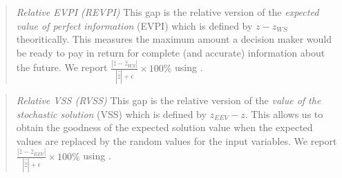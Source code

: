 
\begin{quote}
\noindent\textit{Relative EVPI (REVPI)} This gap is the relative version of the \textit{expected value of perfect information} (EVPI) which is defined by $z-z_{WS}$ theoritically. This measures the maximum amount a decision maker would be ready to pay in return for complete (and accurate) information about the future. We report $\frac{|\hat{z}-\hat{z}_{WS}|}{|\hat{\hat{z}}|+\epsilon}\times 100\%$ using \cplex.
\end{quote}

\begin{quote}
	\noindent\textit{Relative VSS (RVSS)} This gap is the relative version of the \textit{value of the stochastic solution} (VSS) which is defined by $z_{EEV}-z$. This allows us to obtain the goodness of the expected solution value when the expected values are replaced by the random values for the input variables. We report $\frac{|\hat{z}-\hat{z}_{EEV}|}{|\hat{\hat{z}}|+\epsilon}\times 100\%$ using \cplex.
\end{quote}





